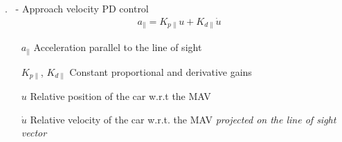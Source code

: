 


\begin{frame}{\thesection. \insertsection \ - \insertsubsection}
	Approach velocity PD control
	\begin{align}
		a_\parallel = K_{p\parallel} u + K_{d\parallel} \dot{u} 
	\end{align}
	\begin{enumerate}
		\item[$a_\parallel$] Acceleration parallel to the line of sight
		\item[$K_{p\parallel}$, $K_{d\parallel}$] Constant proportional and derivative gains
		\item[$u$] Relative position of the car w.r.t the MAV
		\item[$\dot{u}$] Relative velocity of the car w.r.t. the MAV \textit{projected on the line of sight vector}
	\end{enumerate}
\end{frame}




